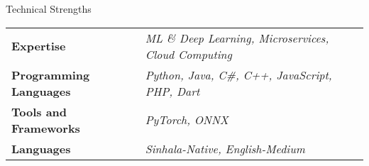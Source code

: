 \documentclass[
	11pt, %
]{./assets/resume} %
\begin{document}
	




\begin{rSection}{Technical Strengths}

	\def\arraystretch{1.5}

	\begin{tabular}{ l l}
		\textbf{Expertise} & \emph{ML \& Deep Learning, Microservices, Cloud Computing} \\
		\textbf{Programming Languages} & \emph{Python, Java, C\#, C++, JavaScript, PHP, Dart} \\
		\textbf{Tools and Frameworks} & \emph{PyTorch, ONNX} \\ 
		\textbf{Languages} & \emph{Sinhala-Native, English-Medium} \\
	\end{tabular}

\end{rSection}

\end{document}
